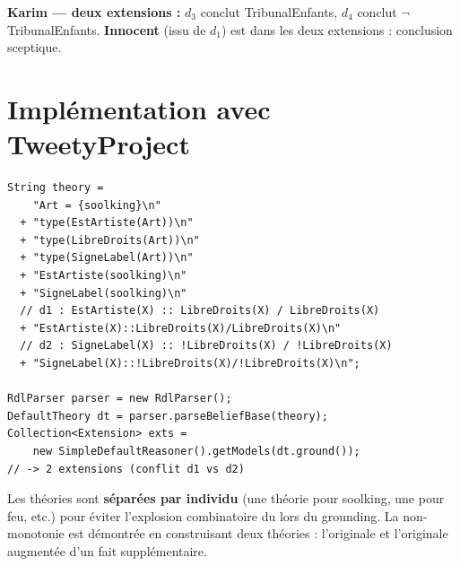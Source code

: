 \medskip
\noindent\textbf{Karim — deux extensions :}
$d_3$ conclut TribunalEnfants, $d_4$ conclut $\lnot$TribunalEnfants.
\textbf{Innocent} (issu de $d_1$) est dans les deux extensions : conclusion sceptique.

\section{Implémentation avec TweetyProject}

\begin{lstlisting}[caption={Calcul des extensions avec Tweety RDL}]
String theory =
    "Art = {soolking}\n"
  + "type(EstArtiste(Art))\n"
  + "type(LibreDroits(Art))\n"
  + "type(SigneLabel(Art))\n"
  + "EstArtiste(soolking)\n"
  + "SigneLabel(soolking)\n"
  // d1 : EstArtiste(X) :: LibreDroits(X) / LibreDroits(X)
  + "EstArtiste(X)::LibreDroits(X)/LibreDroits(X)\n"
  // d2 : SigneLabel(X) :: !LibreDroits(X) / !LibreDroits(X)
  + "SigneLabel(X)::!LibreDroits(X)/!LibreDroits(X)\n";

RdlParser parser = new RdlParser();
DefaultTheory dt = parser.parseBeliefBase(theory);
Collection<Extension> exts =
    new SimpleDefaultReasoner().getModels(dt.ground());
// -> 2 extensions (conflit d1 vs d2)
\end{lstlisting}

\begin{tcolorbox}[notebox, title={Point d'implémentation important}]
Les théories sont \textbf{séparées par individu} (une théorie pour soolking,
une pour feu, etc.) pour éviter l'explosion combinatoire du
 lors du grounding.
La non-monotonie est démontrée en construisant deux théories : l'originale et
l'originale augmentée d'un fait supplémentaire.
\end{tcolorbox}
